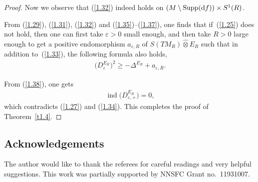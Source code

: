 \documentclass[10pt,a4paper]{amsart}
\numberwithin{equation}{section}
\theoremstyle{definition}
\begin{document}
\begin{proof}
Now we observe that (\ref{1.32}) indeed holds on $(M\setminus \operatorname{Supp}({\rm d}f))\times S^1(R)$.

From (\ref{1.29}), (\ref{1.31}), (\ref{1.32}) and (\ref{1.35})--(\ref{1.37}), one finds that if~(\ref{1.25}) does not hold, then one can first take $\varepsilon>0$ small enough, and then take $R>0$ large enough to get a positive endomorphism $a_{\varepsilon,R}$ of $S(TM_R)\widehat\otimes E_R$ such that in addition to~(\ref{1.33}), the following formula also holds,
 \begin{gather}\label{1.38}
\big(D_\varepsilon^{E_R}\big)^2 \geq -\Delta^{E_R} +a_{\varepsilon,R}.
\end{gather}

From (\ref{1.38}), one gets
\begin{gather*}%
\operatorname{ind}\big(D^{E_R}_{\varepsilon,+}\big)=0,
\end{gather*}
which contradicts (\ref{1.27}) and (\ref{1.34}). This completes the proof of Theorem~\ref{t1.4}.
\end{proof}


\subsection*{Acknowledgements}

The author would like to thank the referees for careful readings and very helpful suggestions. This work was partially supported by NNSFC Grant no.~11931007.

\end{document}
